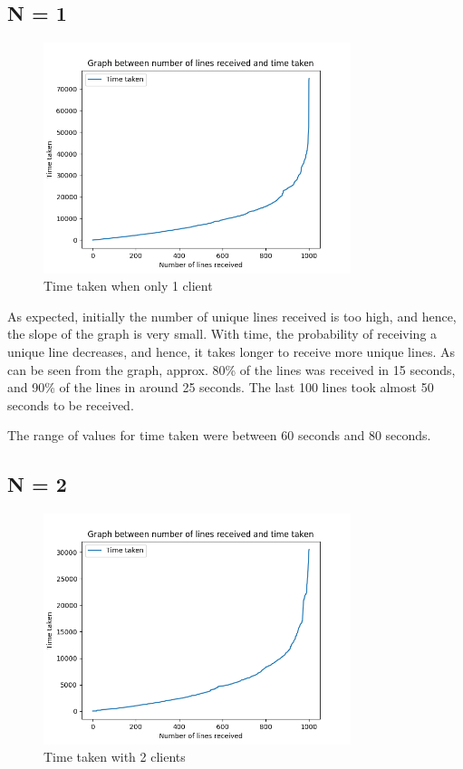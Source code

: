 \documentclass[12pt]{scrartcl}
\begin{document}
\subsection{N = 1}

\begin{figure}[H]
    \centering
    \includegraphics[width=0.8\textwidth]{images/latency_n_1.png}
    \caption{Time taken when only 1 client}
    \label{fig:my_label}
\end{figure}

As expected, initially the number of unique lines received is too high, and hence, the slope of the graph is very small. With time, the probability of receiving a unique line decreases, and hence, it takes longer to receive more unique lines. As can be seen from the graph, approx. 80\% of the lines was received in 15 seconds, and 90\% of the lines in around 25 seconds. The last 100 lines took almost 50 seconds to be received.

The range of values for time taken were between 60 seconds and 80 seconds.

\subsection{N = 2}

\begin{figure}[H]
    \centering
    \includegraphics[width=0.8\textwidth]{images/latency_n_2.png}
    \caption{Time taken with 2 clients}
    \label{fig:my_label}
\end{figure}
\end{document}
